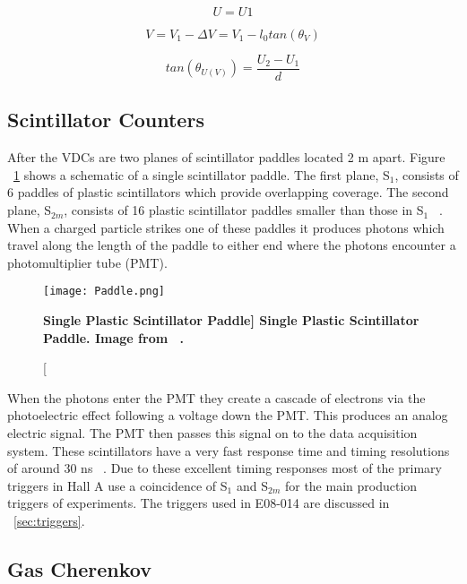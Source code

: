 \begin{equation} \label{eq:u}
	U = U1
\end{equation}

\begin{equation} \label{eq:v}
	V = V_1-\Delta V = V_1 - l_0 tan\left( \theta_V \right)
\end{equation}

\begin{equation} \label{eq:theta_uv}
	tan\left( \theta_{U(V)} \right) = \frac{U_2-U_1}{d}
\end{equation}

\subsection{Scintillator Counters}
\label{ssec:scintillators}

After the VDCs are two planes of scintillator paddles located 2 m apart. Figure ~\ref{fig:paddle} shows a schematic of a single scintillator paddle. The first plane, S$_1$, consists of 6 paddles of plastic scintillators which provide overlapping coverage. The second plane, S$_{2m}$, consists of 16 plastic scintillator paddles smaller than those in S$_1$ ~\cite{Thesis:Ye}. When a charged particle strikes one of these paddles it produces photons which travel along the length of the paddle to either end where the photons encounter a photomultiplier tube (PMT). 

\begin{figure}[!ht]
\begin{center}
\texttt{[image: Paddle.png]}
\end{center}
\caption[\bf{Single Plastic Scintillator Paddle}]{
{\bf{Single Plastic Scintillator Paddle.}} Image from ~\cite{Thesis:Wang}.}
\label{fig:paddle}
\end{figure}

When the photons enter the PMT they create a cascade of electrons via the photoelectric effect following a voltage down the PMT. This produces an analog electric signal. The PMT then passes this signal on to the data acquisition system. These scintillators have a very fast response time and timing resolutions of around 30 ns ~\cite{Thesis:Ye}. Due to these excellent timing responses most of the primary triggers in Hall A use a coincidence of S$_1$ and S$_{2m}$ for the main production triggers of experiments. The triggers used in E08-014 are discussed in ~\ref{sec:triggers}. 

\subsection{Gas Cherenkov}
\label{ssec:gc}

